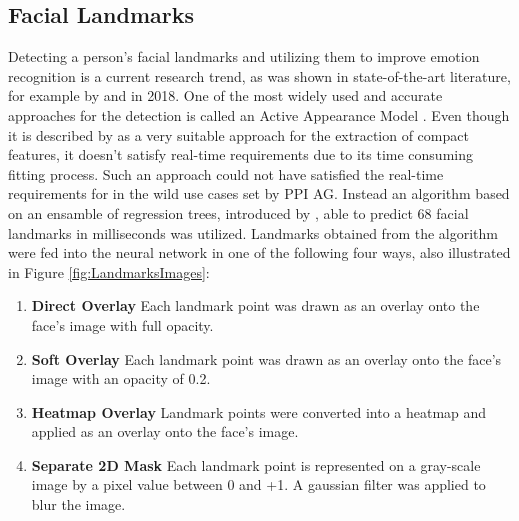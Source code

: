\subsection{Facial Landmarks}
Detecting a person's facial landmarks and utilizing them to improve emotion recognition is a current research trend, as was shown in state-of-the-art literature, for example by \citet{Gupta:2018:FacialLandmarks-1} and \citet{Tautkute:2018:FacialLandmarks-2} in 2018. One of the most widely used and accurate approaches for the detection is called an Active Appearance Model \citep{Cootes:2001:ActiveAppearanceModel}. Even though it is described by \citet{Gao:2010:ActiveAppearanceModels} as a very suitable approach for the extraction of compact features, it doesn't satisfy real-time requirements due to its time consuming fitting process.
\newline\newline
Such an approach could not have satisfied the real-time requirements for in the wild use cases set by PPI AG. Instead an algorithm based on an ensamble of regression trees, introduced by \citet{Kazemi:2014:ShapePredictor}, able to predict 68 facial landmarks in milliseconds was utilized.
\newline\newline
Landmarks obtained from the algorithm were fed into the neural network in one of the following four ways, also illustrated in Figure \ref{fig:LandmarksImages}: \newline

\begin{enumerate}
    \item \textbf{Direct Overlay} \newline \indent Each landmark point was drawn as an overlay onto the face's image with full opacity.
    \item \textbf{Soft Overlay} \newline \indent Each landmark point was drawn as an overlay onto the face's image with an opacity of 0.2.
    \item \textbf{Heatmap Overlay} \newline \indent Landmark points were converted into a heatmap and applied as an overlay onto the face's image.
    \item \textbf{Separate 2D Mask} \newline \indent Each landmark point is represented on a gray-scale image by a pixel value between 0 and +1. A gaussian filter was applied to blur the image.
\end{enumerate}

